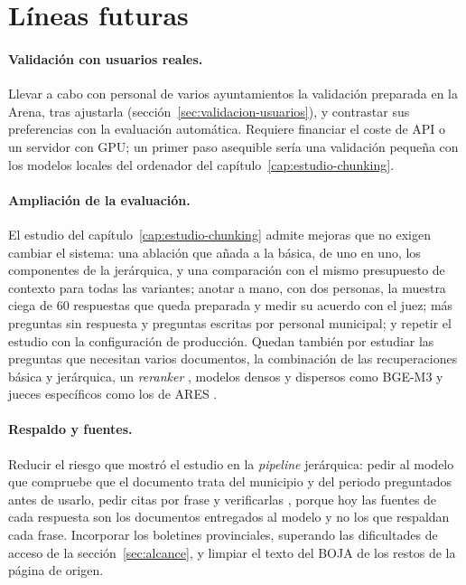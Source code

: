 \section{Líneas futuras}
\label{sec:futuras}

\paragraph{Validación con usuarios reales.} Llevar a cabo con personal de varios ayuntamientos la validación preparada en la Arena, tras ajustarla (sección~\ref{sec:validacion-usuarios}), y contrastar sus preferencias con la evaluación automática. Requiere financiar el coste de API o un servidor con GPU; un primer paso asequible sería una validación pequeña con los modelos locales del ordenador del capítulo~\ref{cap:estudio-chunking}.

\paragraph{Ampliación de la evaluación.} El estudio del capítulo~\ref{cap:estudio-chunking} admite mejoras que no exigen cambiar el sistema: una ablación que añada a la básica, de uno en uno, los componentes de la jerárquica, y una comparación con el mismo presupuesto de contexto para todas las variantes; anotar a mano, con dos personas, la muestra ciega de 60 respuestas que queda preparada y medir su acuerdo con el juez; más preguntas sin respuesta y preguntas escritas por personal municipal; y repetir el estudio con la configuración de producción. Quedan también por estudiar las preguntas que necesitan varios documentos, la combinación de las recuperaciones básica y jerárquica, un \emph{reranker} \cite{nogueira2019rerank}, modelos densos y dispersos como BGE-M3 \cite{chen2024bgem3} y jueces específicos como los de ARES \cite{saadfalcon2024ares}.

\paragraph{Respaldo y fuentes.} Reducir el riesgo que mostró el estudio en la \emph{pipeline} jerárquica: pedir al modelo que compruebe que el documento trata del municipio y del periodo preguntados antes de usarlo, pedir citas por frase y verificarlas \cite{gao2023alce}, porque hoy las fuentes de cada respuesta son los documentos entregados al modelo y no los que respaldan cada frase. Incorporar los boletines provinciales, superando las dificultades de acceso de la sección~\ref{sec:alcance}, y limpiar el texto del BOJA de los restos de la página de origen.

